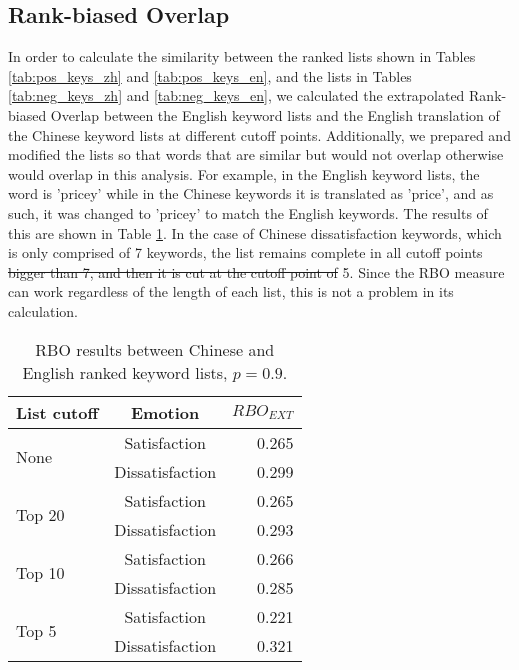 \documentclass[review]{elsarticle}
\providecommand{\DIFadd}[1]{{\protect\color{blue}\uwave{#1}}} %
\providecommand{\DIFdel}[1]{{\protect\color{red}\sout{#1}}}                      %
\providecommand{\DIFaddbegin}{} %
\providecommand{\DIFaddend}{} %
\providecommand{\DIFdelbegin}{} %
\providecommand{\DIFdelend}{} %
\newcommand{\DIFscaledelfig}{0.5}
\newlength{\DIFdelgraphicswidth} %
\newlength{\DIFdelgraphicsheight} %
\newcommand{\DIFaddincludegraphics}[2][]{{\color{blue}\fbox{\DIFOincludegraphics[#1]{#2}}}} %
\newcommand{\DIFdelincludegraphics}[2][]{%
\sbox{\DIFdelgraphicsbox}{\DIFOincludegraphics[#1]{#2}}%
\settoboxwidth{\DIFdelgraphicswidth}{\DIFdelgraphicsbox} %
\settoboxtotalheight{\DIFdelgraphicsheight}{\DIFdelgraphicsbox} %
\scalebox{\DIFscaledelfig}{%
\parbox[b]{\DIFdelgraphicswidth}{\usebox{\DIFdelgraphicsbox}\\[-\baselineskip] \rule{\DIFdelgraphicswidth}{0em}}\llap{\resizebox{\DIFdelgraphicswidth}{\DIFdelgraphicsheight}{%
\setlength{\unitlength}{\DIFdelgraphicswidth}%
\begin{picture}(1,1)%
\thicklines\linethickness{2pt} %
{\color[rgb]{1,0,0}\put(0,0){\framebox(1,1){}}}%
{\color[rgb]{1,0,0}\put(0,0){\line( 1,1){1}}}%
{\color[rgb]{1,0,0}\put(0,1){\line(1,-1){1}}}%
\end{picture}%
}\hspace*{3pt}}} %
} %
\DeclareRobustCommand{\DIFaddbegin}{\DIFOaddbegin \let\includegraphics\DIFaddincludegraphics} %
\DeclareRobustCommand{\DIFaddend}{\DIFOaddend \let\includegraphics\DIFOincludegraphics} %
\DeclareRobustCommand{\DIFdelbegin}{\DIFOdelbegin \let\includegraphics\DIFdelincludegraphics} %
\DeclareRobustCommand{\DIFdelend}{\DIFOaddend \let\includegraphics\DIFOincludegraphics} %
\begin{document}
\subsection{Rank-biased Overlap}\label{rboresults}

In order to calculate the similarity between the ranked lists shown in Tables \ref{tab:pos_keys_zh} and \ref{tab:pos_keys_en}, and the lists in Tables \ref{tab:neg_keys_zh} and \ref{tab:neg_keys_en}, we calculated the extrapolated Rank-biased Overlap between the English keyword lists and the English translation of the Chinese keyword lists at different cutoff points. Additionally, we prepared and modified the lists so that words that are similar but would not overlap otherwise would overlap in this analysis. For example, in the English keyword lists, the word is 'pricey' while in the Chinese keywords it is translated as 'price', and as such, it was changed to 'pricey' to match the English keywords. The results of this are shown in Table \ref{tab:rbo}. In the case of Chinese dissatisfaction keywords, which is only comprised of 7 keywords, the list remains complete in all cutoff points \DIFdelbegin \DIFdel{bigger than 7, and then it is cut at the cutoff point of }\DIFdelend \DIFaddbegin \DIFadd{except }\DIFaddend 5. Since the RBO measure can work regardless of the length of each list, this is not a problem in its calculation.

\begin{table}[hbp]
\centering
\caption{RBO results between Chinese and English ranked keyword lists, \(p=0.9\).}
\label{tab:rbo}
\begin{tabular}{|l|c|r|}
\hline
\multicolumn{1}{|c|}{\textbf{List cutoff}} & \textbf{Emotion} & \(RBO_{EXT}\) \\ \hline
\multirow{2}{*}{None}   & Satisfaction      & 0.265 \\ \cline{2-3} 
                        & Dissatisfaction   & 0.299 \\ \hline
\multirow{2}{*}{Top 20} & Satisfaction      & 0.265 \\ \cline{2-3} 
                        & Dissatisfaction   & 0.293 \\ \hline
\multirow{2}{*}{Top 10} & Satisfaction      & 0.266 \\ \cline{2-3} 
                        & Dissatisfaction   & 0.285 \\ \hline
\multirow{2}{*}{Top 5}  & Satisfaction      & 0.221 \\ \cline{2-3} 
                        & Dissatisfaction   & 0.321 \\ \hline
\end{tabular}
\end{table}
\end{document}
